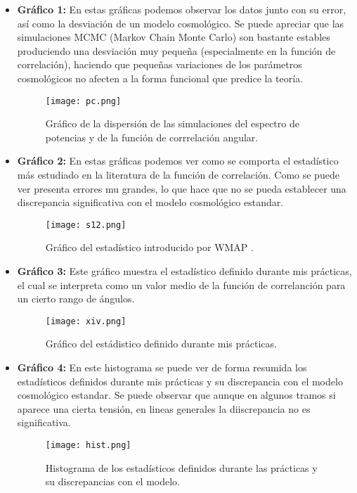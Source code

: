 \documentclass[12pt, a4paper]{article}
\theoremstyle{definition}
\begin{document}
\begin{itemize}
  \item \textbf{Gráfico 1:} En estas gráficas podemos observar los datos junto con su error, así como la desviación de un modelo cosmológico. Se puede apreciar que las simulaciones MCMC (Markov Chain Monte Carlo) son bastante estables produciendo una desviación muy pequeña (especialmente en la función de correlación), haciendo que pequeñas variaciones de los parámetros cosmológicos no afecten a la forma funcional que predice la teoría.
        \begin{figure}[H]
          \centering
          \texttt{[image: pc.png]}
          \caption{Gráfico de la dispersión de las simulaciones del espectro de potencias y de la función de corrrelación angular.}
          \label{fig:esp-cor}
        \end{figure}
  \item \textbf{Gráfico 2:} En estas gráficas podemos ver como se comporta el estadístico más estudiado en la literatura de la función de correlación. Como se puede ver presenta errores mu grandes, lo que hace que no se pueda establecer una discrepancia significativa con el modelo cosmológico estandar.

        \begin{figure}[H]
          \centering
          \texttt{[image: s12.png]}
          \caption{Gráfico del estadístico introducido por WMAP \autocite{Spergel_2003}.}
          \label{fig:enter-label}
        \end{figure}
  \item \textbf{Gráfico 3:} Este gráfico muestra el estadístico definido durante mis prácticas, el cual se interpreta como un valor medio de la función de correlanción para un cierto rango de ángulos.

        \begin{figure}[H]
          \centering
          \texttt{[image: xiv.png]}
          \caption{Gráfico del estádistico definido durante mis prácticas.}
          \label{fig:enter-label}
        \end{figure}
  \item \textbf{Gráfico 4:} En este histograma se puede ver de forma resumida los estadísticos definidos durante mis prácticas y su discrepancia con el modelo cosmológico estandar. Se puede observar que aunque en algunos tramos si aparece una cierta tensión, en lineas generales la diiscrepancia no es significativa.
        \begin{figure}[H]
          \centering
          \texttt{[image: hist.png]}
          \caption{Histograma de los estadísticos definidos durante las prácticas y su discrepancias con el modelo.}
          \label{fig:enter-label}
        \end{figure}
\end{itemize}
\end{document}
